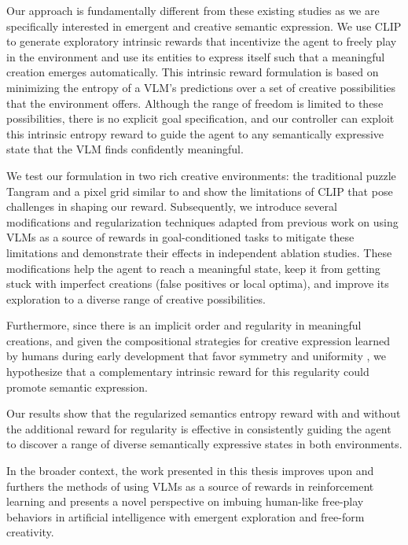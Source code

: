 Our approach is fundamentally different from these existing studies as we are specifically interested in emergent and creative semantic expression.
We use CLIP to generate exploratory intrinsic rewards that incentivize the agent to freely play in the environment and use its entities to express itself such that a meaningful creation emerges automatically.
This intrinsic reward formulation is based on minimizing the entropy of a VLM's predictions over a set of creative possibilities that the environment offers.
Although the range of freedom is limited to these possibilities, there is no explicit goal specification,
and our controller can exploit this intrinsic entropy reward to guide the agent to any semantically expressive state that the VLM finds confidently meaningful.

We test our formulation in two rich creative environments: the traditional puzzle Tangram and a pixel grid similar to  and show the limitations of CLIP that pose challenges in shaping our reward.
Subsequently, we introduce several modifications and regularization techniques adapted from previous work on using VLMs as a source of rewards in goal-conditioned tasks to mitigate these limitations and demonstrate their effects in independent ablation studies.
These modifications help the agent to reach a meaningful state, keep it from getting stuck with imperfect creations (false positives or local optima), and improve its exploration to a diverse range of creative possibilities.


Furthermore, since there is an implicit order and regularity in meaningful creations, and given the compositional strategies for creative expression learned by humans during early development that favor symmetry \citep{symmetry} and uniformity \citep{compositional}, we hypothesize that a complementary intrinsic reward for this regularity \citep{rair} could promote semantic expression.

Our results show that the regularized semantics entropy reward with and without the additional reward for regularity is effective in consistently guiding the agent to discover a range of diverse semantically expressive states in both environments.


In the broader context, the work presented in this thesis improves upon and furthers the methods of using VLMs as a source of rewards in reinforcement learning and presents a novel perspective on imbuing human-like free-play behaviors in artificial intelligence with emergent exploration and free-form creativity.

